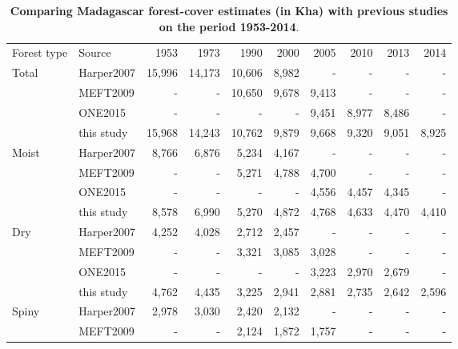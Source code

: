 \documentclass[essd, classical]{copernicus}
\begin{document}
\begin{table}[h]

  \caption{\textbf{Comparing Madagascar forest-cover estimates (in Kha)
      with previous studies on the period 1953-2014}.}
  \label{tab:comp_forest}

  \begin{tabular}{@{}llrrrrrrrr@{}}
    \tophline
    Forest type & Source & 1953 & 1973 & 1990 & 2000 & 2005 & 2010 & 2013 &
                                                                            2014 \\
    \middlehline
    Total & Harper2007 & 15,996 & 14,173 & 10,606 & 8,982 & - & - & - & - \\
          & MEFT2009 & - & - & 10,650 & 9,678 & 9,413 & - & - & - \\
                & ONE2015 & - & - & - & - & 9,451 & 8,977 & 8,486 & - \\
                & this study & 15,968 & 14,243 & 10,762 & 9,879 & 9,668 & 9,320 & 9,051
                                                                          & 8,925 \\
    Moist & Harper2007 & 8,766 & 6,876 & 5,234 & 4,167 & - & - & - &
                                                                     - \\
                & MEFT2009 & - & - & 5,271 & 4,788 & 4,700 & - & - & - \\
                & ONE2015 & - & - & - & - & 4,556 & 4,457 & 4,345 & - \\
                & this study & 8,578 & 6,990 & 5,270 & 4,872 & 4,768 & 4,633 & 4,470 &
                                                                                       4,410 \\
    Dry & Harper2007 & 4,252 & 4,028 & 2,712 & 2,457 & - & - & - &
                                                                   - \\
                & MEFT2009 & - & - & 3,321 & 3,085 & 3,028 & - & - & - \\
                & ONE2015 & - & - & - & - & 3,223 & 2,970 & 2,679 & - \\
                & this study & 4,762 & 4,435 & 3,225 & 2,941 & 2,881 & 2,735 & 2,642 &
                                                                                       2,596 \\
    Spiny & Harper2007 & 2,978 & 3,030 & 2,420 & 2,132 & - & - & - &
                                                                     - \\
                & MEFT2009 & - & - & 2,124 & 1,872 & 1,757 & - & - & - \\

\end{tabular}
\end{table}
\end{document}
